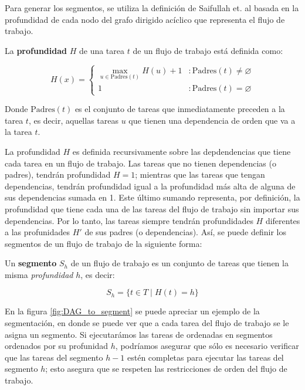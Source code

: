 Para generar los segmentos, se utiliza la definición de Saifullah et. al \cite{saifullah2013multi} basada en la profundidad de cada nodo del grafo dirigido acíclico que representa el flujo de trabajo.

\begin{defn}

La \textbf{profundidad} $H$ de una tarea $t$ de un flujo de trabajo está definida como:

\begin{displaymath}
H(x) = \left\{
     \begin{array}{lr}
       \max_{u \in \text{Padres}(t) } H(u) + 1 & : \text{Padres}(t) \neq \varnothing \\
       1                                       & : \text{Padres}(t) = \varnothing
     \end{array}
   \right.
\end{displaymath}

\noindent Donde $\text{Padres}(t)$ es el conjunto de tareas que inmediatamente preceden a la tarea $t$, es decir, aquellas tareas $u$ que tienen una dependencia de orden que va a la tarea $t$.
\end{defn}

La profundidad $H$ es definida recursivamente sobre las depdendencias que tiene cada tarea en un flujo de trabajo. Las tareas que no tienen dependencias (o padres), tendrán profundidad $H = 1$; mientras que las tareas que tengan dependencias, tendrán profundidad igual a la profundidad más alta de alguna de sus dependencias sumada en 1. Este último sumando representa, por definición, la profundidad que tiene cada una de las tareas del flujo de trabajo sin importar sus dependencias. Por lo tanto, las tareas siempre tendrán profundidades $H$ diferentes a las profunidades $H'$ de sus padres (o dependencias). Así, se puede definir los segmentos de un flujo de trabajo de la siguiente forma:

\begin{defn}
Un \textbf{segmento} $S_h$ de un flujo de trabajo es un conjunto de tareas que tienen la misma \emph{profundidad} $h$, es decir: 

\begin{displaymath}
S_h = \{ t \in T \mid H(t) = h \}
\end{displaymath}

\end{defn}

En la figura \ref{fig:DAG_to_segment} se puede apreciar un ejemplo de la segmentación, en donde se puede ver que a cada tarea del flujo de trabajo se le asigna un segmento. Si ejecutarámos las tareas de ordenadas en segmentos ordenados por su profunidad $h$, podríamos asegurar que sólo es necesario verificar que las tareas del segmento $h - 1$ estén completas para ejecutar las tareas del segmento $h$; esto asegura que se respeten las restricciones de orden del flujo de trabajo.


